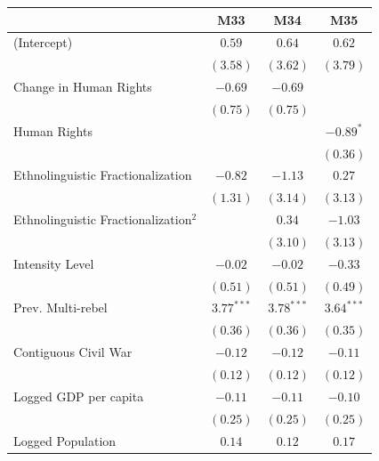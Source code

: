 \documentclass[12pt,]{book}
\let\origtable\table
\let\endorigtable\endtable
\renewenvironment{table}[1][2] {
    \singlespacing
    \expandafter\origtable\expandafter[H]
} {
    \endorigtable
}
\theoremstyle{definition}
\theoremstyle{definition}
\theoremstyle{definition}
\theoremstyle{remark}
\begin{document}
\begin{table}
\begin{center}
\begin{tabular}{l c c c }
\hline
 & M33 & M34 & M35 \\
\hline
(Intercept)                             & $0.59$       & $0.64$       & $0.62$       \\
                                        & $(3.58)$     & $(3.62)$     & $(3.79)$     \\
Change in Human Rights                  & $-0.69$      & $-0.69$      &              \\
                                        & $(0.75)$     & $(0.75)$     &              \\
Human Rights                            &              &              & $-0.89^{*}$  \\
                                        &              &              & $(0.36)$     \\
Ethnolinguistic Fractionalization       & $-0.82$      & $-1.13$      & $0.27$       \\
                                        & $(1.31)$     & $(3.14)$     & $(3.13)$     \\
Ethnolinguistic Fractionalization$^{2}$ &              & $0.34$       & $-1.03$      \\
                                        &              & $(3.10)$     & $(3.13)$     \\
Intensity Level                         & $-0.02$      & $-0.02$      & $-0.33$      \\
                                        & $(0.51)$     & $(0.51)$     & $(0.49)$     \\
Prev. Multi-rebel                       & $3.77^{***}$ & $3.78^{***}$ & $3.64^{***}$ \\
                                        & $(0.36)$     & $(0.36)$     & $(0.35)$     \\
Contiguous Civil War                    & $-0.12$      & $-0.12$      & $-0.11$      \\
                                        & $(0.12)$     & $(0.12)$     & $(0.12)$     \\
Logged GDP per capita                   & $-0.11$      & $-0.11$      & $-0.10$      \\
                                        & $(0.25)$     & $(0.25)$     & $(0.25)$     \\
Logged Population                       & $0.14$       & $0.12$       & $0.17$       \\

\end{tabular}
\end{center}
\end{table}
\end{document}
